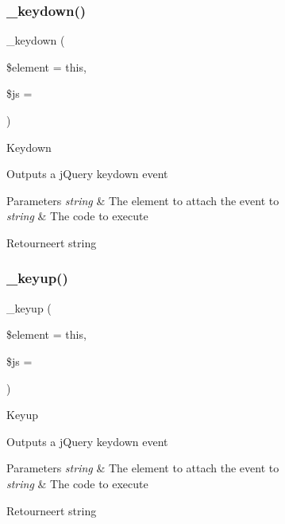 \subsubsection{\texorpdfstring{\_keydown()}{\_keydown()}}
{\footnotesize\ttfamily \+\_\+keydown (\begin{DoxyParamCaption}\item[{}]{\$element = {\ttfamily \textquotesingle{}this\textquotesingle{}},  }\item[{}]{\$js = {\ttfamily \textquotesingle{}\textquotesingle{}} }\end{DoxyParamCaption})\hspace{0.3cm}{\ttfamily [protected]}}

Keydown

Outputs a j\+Query keydown event


\begin{DoxyParams}{Parameters}
{\em string} & The element to attach the event to \\
\hline
{\em string} & The code to execute \\
\hline
\end{DoxyParams}
\begin{DoxyReturn}{Retourneert}
string 
\end{DoxyReturn}
\mbox{\label{class_c_i___jquery_a8671a9d5ea385d65bc6c7ff4b577adfe}} 
\subsubsection{\texorpdfstring{\_keyup()}{\_keyup()}}
{\footnotesize\ttfamily \+\_\+keyup (\begin{DoxyParamCaption}\item[{}]{\$element = {\ttfamily \textquotesingle{}this\textquotesingle{}},  }\item[{}]{\$js = {\ttfamily \textquotesingle{}\textquotesingle{}} }\end{DoxyParamCaption})\hspace{0.3cm}{\ttfamily [protected]}}

Keyup

Outputs a j\+Query keydown event


\begin{DoxyParams}{Parameters}
{\em string} & The element to attach the event to \\
\hline
{\em string} & The code to execute \\
\hline
\end{DoxyParams}
\begin{DoxyReturn}{Retourneert}
string 
\end{DoxyReturn}
\mbox{\label{class_c_i___jquery_a24c1ddb2247d180ca74532e991afd4f6}} 
